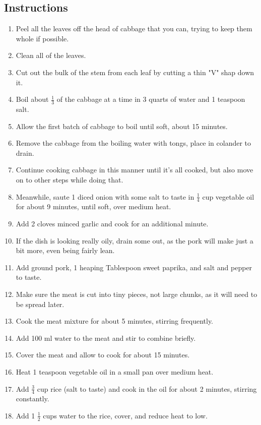 \begin{multicols}{2}
\subsection*{Instructions}
\begin{enumerate}
    \item Peel all the leaves off the head of cabbage that you can, trying to keep them whole if possible.
    \item Clean all of the leaves.
    \item Cut out the bulk of the stem from each leaf by cutting a thin "V" shap down it.
    \item Boil about \( \frac{1}{3} \) of the cabbage at a time in 3 quarts of water and 1 teaspoon salt.
    \item Allow the first batch of cabbage to boil until soft, about 15 minutes.
    \item Remove the cabbage from the boiling water with tongs, place in colander to drain.
    \item Continue cooking cabbage in this manner until it's all cooked, but also move on to other steps while doing that.
    \item Meanwhile, saute 1 diced onion with some salt to taste in \( \frac{1}{4} \) cup vegetable oil for about 9 minutes, until soft, over medium heat.
    \item Add 2 cloves minced garlic and cook for an additional minute.
    \item If the dish is looking really oily, drain some out, as the pork will make just a bit more, even being fairly lean.
    \item Add ground pork, 1 heaping Tablespoon sweet paprika, and salt and pepper to taste.
    \item Make sure the meat is cut into tiny pieces, not large chunks, as it will need to be spread later.
    \item Cook the meat mixture for about 5 minutes, stirring frequently.
    \item Add 100 ml water to the meat and stir to combine briefly.
    \item Cover the meat and allow to cook for about 15 minutes.
    \item Heat 1 teaspoon vegetable oil in a small pan over medium heat.
    \item Add \( \frac{3}{4} \) cup rice (salt to taste) and cook in the oil for about 2 minutes, stirring constantly.
    \item Add 1 \( \frac{1}{2} \) cups water to the rice, cover, and reduce heat to low.

\end{enumerate}
\end{multicols}
